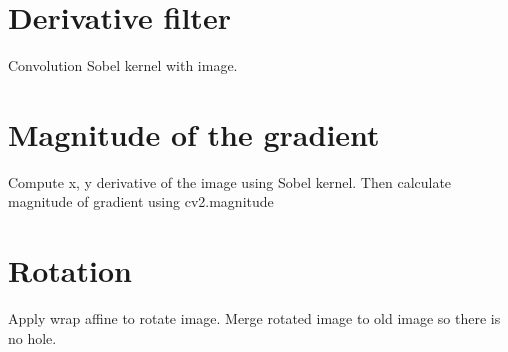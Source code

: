 \documentclass[]{article}
\begin{document}
\section{Derivative filter}
Convolution Sobel kernel with image. 

\section{Magnitude of the gradient}
Compute x, y derivative of the image using Sobel kernel. Then calculate magnitude of gradient using cv2.magnitude 


\section{Rotation}
Apply wrap affine to rotate image. Merge rotated image to old image so there is no hole. 
\end{document}
